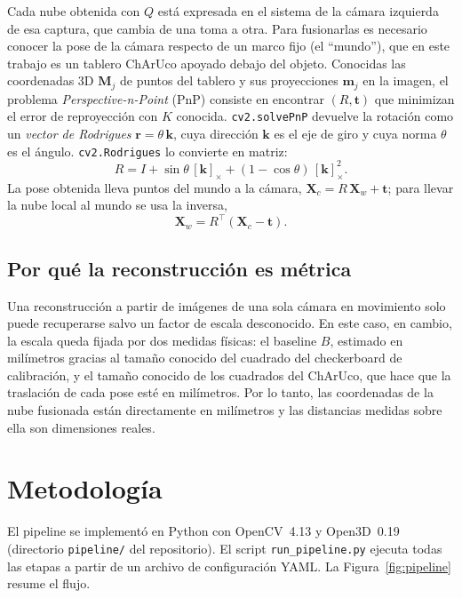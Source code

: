 \documentclass[conference]{IEEEtran}
\begin{document}
Cada nube obtenida con $Q$ está expresada en el sistema de la cámara
izquierda de esa captura, que cambia de una toma a otra. Para fusionarlas es
necesario conocer la pose de la cámara respecto de un marco fijo (el
``mundo''), que en este trabajo es un tablero ChArUco apoyado debajo del
objeto. Conocidas las coordenadas 3D $\mathbf{M}_j$ de puntos del tablero y
sus proyecciones $\mathbf{m}_j$ en la imagen, el problema
\emph{Perspective-n-Point} (PnP) consiste en encontrar $(R,\mathbf{t})$ que
minimizan el error de reproyección con $K$ conocida.
\texttt{cv2.solvePnP} devuelve la rotación como un \emph{vector de Rodrigues}
$\mathbf{r}=\theta\,\mathbf{k}$, cuya dirección $\mathbf{k}$ es el eje de
giro y cuya norma $\theta$ es el ángulo. \texttt{cv2.Rodrigues} lo convierte
en matriz:
\begin{equation}
  R = I + \sin\theta\,[\mathbf{k}]_\times + (1-\cos\theta)\,[\mathbf{k}]_\times^2 .
\end{equation}
La pose obtenida lleva puntos del mundo a la cámara,
$\mathbf{X}_c=R\,\mathbf{X}_w+\mathbf{t}$; para llevar la nube local al
mundo se usa la inversa,
\begin{equation}
  \mathbf{X}_w = R^\top(\mathbf{X}_c-\mathbf{t}).
  \label{eq:cam2world}
\end{equation}

\subsection{Por qué la reconstrucción es métrica}

Una reconstrucción a partir de imágenes de una sola cámara en movimiento
solo puede recuperarse salvo un factor de escala desconocido. En este caso,
en cambio, la escala queda fijada por dos medidas físicas: el baseline $B$,
estimado en milímetros gracias al tamaño conocido del cuadrado del
checkerboard de calibración, y el tamaño conocido de los cuadrados del
ChArUco, que hace que la traslación de cada pose esté en milímetros. Por lo
tanto, las coordenadas de la nube fusionada están directamente en milímetros
y las distancias medidas sobre ella son dimensiones reales.

\section{Metodología}

El pipeline se implementó en Python con OpenCV~4.13 y Open3D~0.19
(directorio \texttt{pipeline/} del repositorio). El script
\texttt{run\_pipeline.py} ejecuta todas las etapas a partir de un archivo de
configuración YAML. La Figura~\ref{fig:pipeline} resume el flujo.
\end{document}
